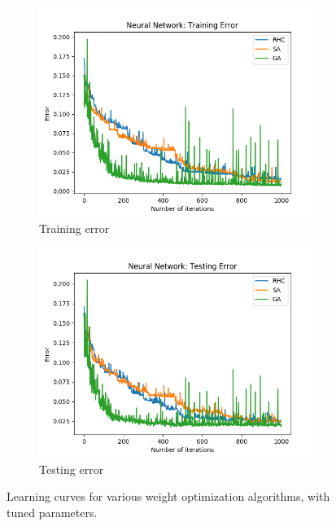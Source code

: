 \documentclass{article}
\begin{document}
      \begin{figure}[htb]
      \centering

      \begin{subfigure}{0.5\textwidth}
        \includegraphics[width=\linewidth]{out/nn-combined-training.png}
        \caption{Training error}
        \label{fig:nn-compare-1}
      \end{subfigure}\hfil
      \begin{subfigure}{0.5\textwidth}
        \includegraphics[width=\linewidth]{out/nn-combined-testing.png}
        \caption{Testing error}
        \label{fig:nn-compare-2}
      \end{subfigure}

      \caption{Learning curves for various weight optimization algorithms, with tuned parameters.}
      \label{fig:nn-compare}
      \end{figure}
\end{document}
